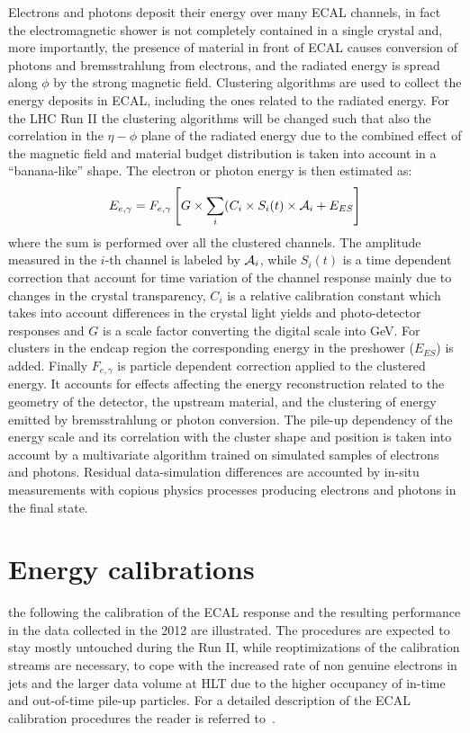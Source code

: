 \documentclass[journal]{IEEEtran}
\begin{document}
Electrons and photons deposit their energy over many ECAL channels, in fact the electromagnetic shower is not completely contained in a single crystal and, more importantly, the presence of material in front of ECAL causes conversion of photons and bremsstrahlung from electrons, and the radiated energy is spread along $\phi$ by the strong magnetic field. Clustering algorithms are used to collect the energy deposits in ECAL, including the ones related to the radiated energy. For the LHC Run II the clustering algorithms will be changed such that also the correlation in the $\eta-\phi$ plane of the radiated energy due to the combined effect of the magnetic field and material budget distribution is taken into account in a ``banana-like'' shape. The electron or photon energy is then estimated as:
\begin{equation}
\label{eqn:energy}
E_{e,\gamma} = F_{e,\gamma}\left[G \times \sum_i(C_i \times S_i(t) \times {\cal A}_i + E_{ES}\right]
\end{equation}
where the sum is performed over all the clustered channels. The amplitude measured in the $i$-th channel is labeled by ${\cal A}_i$, while $S_i(t)$ is a time dependent correction that account for time variation of the channel response mainly due to changes in the crystal transparency, $C_i$ is a relative calibration constant which takes into account differences in the crystal light yields and photo-detector responses and $G$ is a scale factor converting the digital scale into GeV. For clusters in the endcap region the corresponding energy in the preshower ($E_{ES}$) is added. Finally $F_{e,\gamma}$ is particle dependent correction applied to the clustered energy. It accounts for effects affecting the energy reconstruction related to the geometry of the detector, the upstream material, and the clustering of energy emitted by bremsstrahlung or photon conversion. The pile-up dependency of the energy scale and its correlation with the cluster shape and position is taken into account by a multivariate algorithm trained on simulated samples of electrons and photons.  Residual data-simulation differences are accounted by in-situ measurements with copious physics processes producing electrons and photons in the final state.



\section{Energy calibrations}
\label{sec:energycalibration}
 the following the calibration of the ECAL response and the resulting performance in the data collected in the 2012 are illustrated. The procedures are expected to stay mostly untouched during the Run II, while reoptimizations of the calibration streams are necessary, to cope with the increased rate of non genuine electrons in jets and the larger data volume at HLT due to the higher occupancy of in-time and out-of-time pile-up particles. For a detailed description of the ECAL calibration procedures the reader is referred to~\cite{Chatrchyan:2013dga}.
\end{document}
